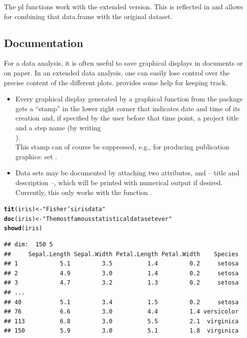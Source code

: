 \documentclass[11pt]{article}\usepackage[]{graphicx}\usepackage[]{color}
\makeatletter
\newcommand{\hlstr}[1]{\textcolor[rgb]{0.192,0.494,0.8}{#1}}%
\newcommand{\hlstd}[1]{\textcolor[rgb]{0.345,0.345,0.345}{#1}}%
\newcommand{\hlkwb}[1]{\textcolor[rgb]{0.69,0.353,0.396}{#1}}%
\newcommand{\hlkwd}[1]{\textcolor[rgb]{0.737,0.353,0.396}{\textbf{#1}}}%
\newenvironment{kframe}{%
 \def\at@end@of@kframe{}%
 \ifinner\ifhmode%
  \def\at@end@of@kframe{\end{minipage}}%
  \begin{minipage}{\columnwidth}%
 \fi\fi%
 \def\FrameCommand##1{\hskip\@totalleftmargin \hskip-\fboxsep
 \colorbox{shadecolor}{##1}\hskip-\fboxsep
     \hskip-\linewidth \hskip-\@totalleftmargin \hskip\columnwidth}%
 \MakeFramed {\advance\hsize-\width
   \@totalleftmargin\z@ \linewidth\hsize
   \@setminipage}}%
 {\par\unskip\endMakeFramed%
 \at@end@of@kframe}
\newenvironment{knitrout}{}{} %
\makeatother
\begin{document}
The pl functions  work with the extended
version. This is reflected in  and allows for
combining that data.frame with the original dataset.

\subsection{Documentation}
For a data analysis, it is often useful to save graphical displays in 
documents or on paper. In an extended data analysis, one can easily lose
control over the precise content of the different plots.
 provides some help for keeping track.
\begin{itemize}
\item 
  Every graphical display generated by a graphical function from the
  package gets a ``stamp'' in the lower right corner that indicates date
  and time of its creation and, if specified by the user before that 
  time point, a project title and a step name (by writing\\
  ).\\
  This stamp can of course be suppressed, e.g., for producing publication
  graphics: set .
\item
  Data sets may be documented by attaching two attributes,  and 
   -- title and description --, which will be printed with
  numerical output if desired.
  Currently, this only works with the function .
\end{itemize}
\begin{knitrout}
\color{fgcolor}\begin{kframe}
\begin{alltt}
  \hlkwd{tit}\hlstd{(iris)} \hlkwb{<-} \hlstr{"Fisher's iris data"}
  \hlkwd{doc}\hlstd{(iris)} \hlkwb{<-} \hlstr{"The most famous statistical dataset ever"}
  \hlkwd{showd}\hlstd{(iris)}
\end{alltt}
\begin{verbatim}
## dim:  150 5 
##     Sepal.Length Sepal.Width Petal.Length Petal.Width    Species
## 1            5.1         3.5          1.4         0.2     setosa
## 2            4.9         3.0          1.4         0.2     setosa
## 3            4.7         3.2          1.3         0.2     setosa
## ...                                                             
## 40           5.1         3.4          1.5         0.2     setosa
## 76           6.6         3.0          4.4         1.4 versicolor
## 113          6.8         3.0          5.5         2.1  virginica
## 150          5.9         3.0          5.1         1.8  virginica
\end{verbatim}
\end{kframe}
\end{knitrout}
\end{document}
